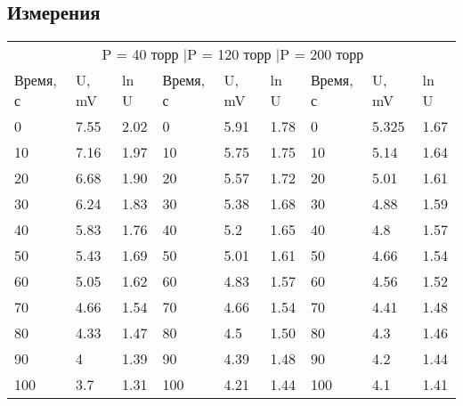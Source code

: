 \documentclass[a4paper,12pt]{article}
\begin{document}
		\subsection{Измерения}
		\begin{center}
			\begin{tabular}{  l  l  p{1cm} |   l  l  p{1cm} |   l  l  p{1cm} }
				\multicolumn{9}{c}{\,P = 40 торр \qquad|\quad\qquad P = 120 торр \qquad\quad|\qquad P = 200 торр } \\ 
				Время, с & U, mV & ln U & Время, с & U, mV & ln U & Время, с & U, mV & ln U \\ \hline
				0   & 7.55  &  2.02 & 0   & 5.91  &  1.78 & 0   & 5.325  &  1.67 \\ \hline
				10  & 7.16  &  1.97 & 10  & 5.75  &  1.75 & 10  & 5.14  &  1.64 \\ \hline
				20  & 6.68  &  1.90 & 20  & 5.57  &  1.72 & 20  & 5.01  &  1.61 \\ \hline
				30  & 6.24  &  1.83 & 30  & 5.38  &  1.68 & 30  & 4.88  &  1.59 \\ \hline
				40  & 5.83  &  1.76 & 40  & 5.2   &  1.65 & 40  & 4.8  &  1.57 \\ \hline
				50  & 5.43  &  1.69 & 50  & 5.01  &  1.61 & 50  & 4.66  &  1.54 \\ \hline
				60  & 5.05  &  1.62 & 60  & 4.83  &  1.57 & 60  & 4.56  &  1.52 \\ \hline
				70  & 4.66  &  1.54 & 70  & 4.66  &  1.54 & 70  & 4.41  &  1.48 \\ \hline
				80  & 4.33  &  1.47 & 80  & 4.5   &  1.50 & 80  & 4.3  &  1.46 \\ \hline
				90  & 4     &  1.39 & 90  & 4.39  &  1.48 & 90  & 4.2    &  1.44 \\ \hline
				100 & 3.7   &  1.31 & 100 & 4.21  &  1.44 & 100 & 4.1   &  1.41 \\
				\hline
			\end{tabular}
		\end{center}
\end{document}
